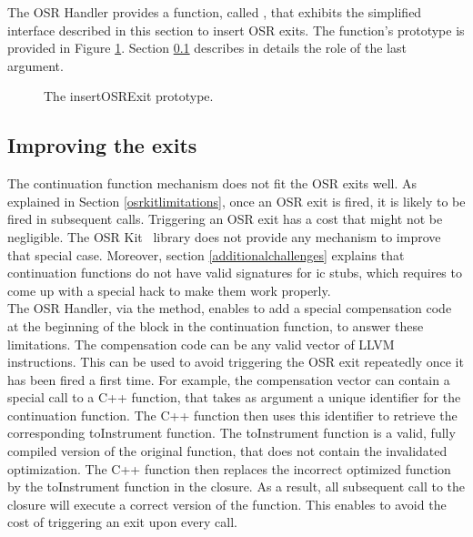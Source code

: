 The OSR Handler provides a function, called , that exhibits the simplified interface described in this section to insert OSR exits.
The function's prototype is provided in Figure \ref{fig:insertoserexit}.
Section \ref{improvingexits} describes in details the role of the last argument.\\

\begin{figure}[h]
\caption{The insertOSRExit prototype.}
\label{fig:insertoserexit}
\end{figure}

\subsection{Improving the exits}\label{improvingexits}

The continuation function mechanism does not fit the OSR exits well.
As explained in Section \ref{osrkitlimitations}, once an OSR exit is fired, it is likely to be fired in subsequent calls.
Triggering an OSR exit has a cost that might not be negligible.
The OSR Kit~\cite{OSRKit} library does not provide any mechanism to improve that special case.
Moreover, section \ref{additionalchallenges} explains that continuation functions do not have valid signatures for ic stubs, which requires to come up with a special hack to make them work properly.\\

The OSR Handler, via the  method, enables to add a special compensation code at the beginning of the  block in the continuation function, to answer these limitations.
The compensation code can be any valid vector of LLVM instructions.
This can be used to avoid triggering the OSR exit repeatedly once it has been fired a first time.
For example, the compensation vector can contain a special call to a C++ function, that takes as argument a unique identifier for the continuation function. 
The C++ function then uses this identifier to retrieve the corresponding toInstrument function.
The toInstrument function is a valid, fully compiled version of the original function, that does not contain the invalidated optimization.
The C++ function then replaces the incorrect optimized function by the toInstrument function in the closure.
As a result, all subsequent call to the closure will execute a correct version of the function.
This enables to avoid the cost of triggering an exit upon every call.\\

